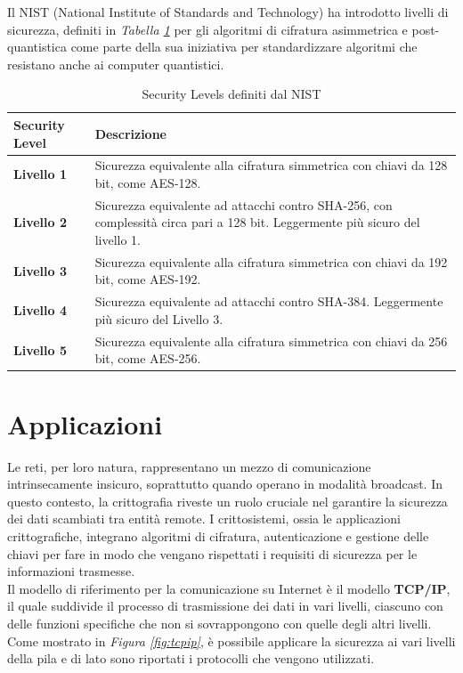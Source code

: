 \noindent
Il NIST (National Institute of Standards and Technology) ha introdotto livelli di sicurezza, definiti in \textit{Tabella \ref{tab:security-levels}} per gli algoritmi di cifratura asimmetrica e post-quantistica come parte della sua iniziativa per standardizzare algoritmi che resistano anche ai computer quantistici.

\begin{table}[ht]
    \centering
    \begin{tabular}{>{\centering\arraybackslash}m{3cm}p{10cm}}
        \toprule
        \textbf{Security Level} & \textbf{Descrizione} \\
        \midrule
        \textbf{Livello 1} & Sicurezza equivalente alla cifratura simmetrica con chiavi da 128 bit, come AES-128.\\
        \textbf{Livello 2} & Sicurezza equivalente ad attacchi contro SHA-256, con complessità circa pari a 128 bit. Leggermente più sicuro del livello 1. \\
        \textbf{Livello 3} & Sicurezza equivalente alla cifratura simmetrica con chiavi da 192 bit, come AES-192. \\
        \textbf{Livello 4} & Sicurezza equivalente ad attacchi contro SHA-384. Leggermente più sicuro del Livello 3. \\
        \textbf{Livello 5} & Sicurezza equivalente alla cifratura simmetrica con chiavi da 256 bit, come AES-256. \\
        \hline
    \end{tabular}
    \caption{Security Levels definiti dal NIST}
    \label{tab:security-levels}
\end{table}

\newpage
\section{Applicazioni}

Le reti, per loro natura, rappresentano un mezzo di comunicazione
intrinsecamente insicuro, soprattutto quando operano in modalità broadcast. In
questo contesto, la crittografia riveste un ruolo cruciale nel garantire la
sicurezza dei dati scambiati tra entità remote. I crittosistemi, ossia le
applicazioni crittografiche, integrano algoritmi di cifratura, autenticazione e
gestione delle chiavi per fare in modo che vengano rispettati i requisiti di sicurezza 
per le informazioni trasmesse.\\ 

\noindent
Il modello di riferimento per la comunicazione su Internet è il modello \textbf{TCP/IP}, il quale  suddivide il processo di trasmissione dei dati
in vari livelli, ciascuno con delle funzioni specifiche che non si sovrappongono con quelle degli altri livelli. Come mostrato in \textit{Figura \ref{fig:tcpip}},
è possibile applicare la sicurezza ai vari livelli della pila e di lato sono riportati i protocolli che vengono utilizzati. 

